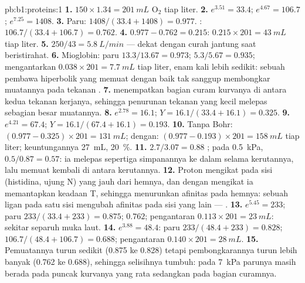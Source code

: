 \begin{solution}{pb:b1:proteins:1}
\textbf{1.} $150\times 1.34 = \qty{201}{mL}$ $\mathrm{O_2}$ tiap liter.
\textbf{2.} $e^{3.51} = 33.4$; $e^{4.67} = 106.7$; $e^{7.25} = 1408$.
\textbf{3.} Paru: $1408/(33.4 + 1408) = 0.977$. :
$106.7/(33.4 + 106.7) = 0.762$.
\textbf{4.} $0.977 - 0.762 = 0.215$: $0.215\times 201 = \qty{43}{mL}$
tiap liter.
\textbf{5.} $250/43 = \qty{5.8}{L/min}$ --- dekat dengan curah jantung
saat beristirahat.
\textbf{6.} Mioglobin: paru $13.3/13.67 = 0.973$; 
$5.3/5.67 = 0.935$; mengantarkan $0.038\times 201 = \qty{7.7}{mL}$ tiap
liter, enam kali lebih sedikit: sebuah pembawa hiperbolik yang memuat
dengan baik tak sanggup membongkar muatannya pada tekanan .
\textbf{7.}  menempatkan bagian curam kurvanya di antara
kedua tekanan kerjanya, sehingga penurunan tekanan yang kecil melepas
sebagian besar muatannya.
\textbf{8.} $e^{2.78} = 16.1$; $Y = 16.1/(33.4 + 16.1) = 0.325$.
\textbf{9.} $e^{4.21} = 67.4$; $Y = 16.1/(67.4 + 16.1) = 0.193$.
\textbf{10.} Tanpa Bohr: $(0.977 - 0.325)\times 201 = \qty{131}{mL}$;
dengan: $(0.977 - 0.193)\times 201 = \qty{158}{mL}$ tiap liter;
keuntungannya
\qty{27}{mL}, \qty{20}{\%}.
\textbf{11.} $2.7/3.07 = 0.88$ ; pada \qty{0.5}{kPa},
$0.5/0.87 = 0.57$: ia melepas sepertiga simpanannya ke dalam
 selama kerutannya, lalu memuat kembali di antara
kerutannya.
\textbf{12.} Proton mengikat pada sisi (histidina, ujung N) yang jauh
dari hemnya, dan dengan mengikat ia memantapkan keadaan T, sehingga
menurunkan afinitas pada hemnya: sebuah ligan pada satu sisi mengubah
afinitas pada sisi yang lain --- .
\textbf{13.} $e^{5.45} = 233$; paru $233/(33.4 + 233) = 0.875$;
 $0.762$; pengantaran $0.113\times 201 = \qty{23}{mL}$: sekitar
separuh muka laut.
\textbf{14.} $e^{3.88} = 48.4$: paru $233/(48.4 + 233) = 0.828$;
 $106.7/(48.4 + 106.7) = 0.688$; pengantaran $0.140\times 201 =
\qty{28}{mL}$.
\textbf{15.} Pemuatannya turun sedikit (0.875 ke 0.828) tetapi
pembongkarannya turun lebih banyak (0.762 ke 0.688), sehingga
selisihnya tumbuh: pada \qty{7}{kPa} parunya masih berada pada puncak
kurvanya yang rata sedangkan  pada bagian curamnya.

\end{solution}
